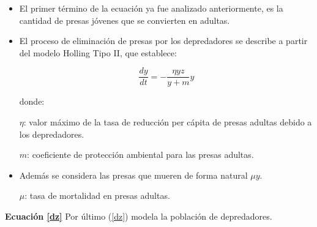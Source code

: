 \documentclass{wscpaperproc}
\theoremstyle{wsc}
\begin{document}
\begin{itemize}
	\item El primer término de la ecuación ya fue analizado anteriormente, es la cantidad de presas jóvenes que se convierten en adultas.

	\item El proceso de eliminación de presas por los depredadores se describe a partir del modelo Holling Tipo II, que establece:

	      $$\frac{dy}{dt} = -\frac{\eta yz}{y+m}y$$

	      donde:

	      $\eta$: valor máximo de la tasa de reducción per cápita de presas adultas debido a los depredadores.

	      $m$: coeficiente de protección ambiental para las presas adultas.

	\item Además se considera las presas que mueren de forma natural $\mu y$.

	      $\mu$: tasa de mortalidad en presas adultas.
\end{itemize}

\vspace*{1cm}
{\bf Ecuación \ref*{dz}}
Por último (\ref*{dz}) modela la población de depredadores.
\end{document}
